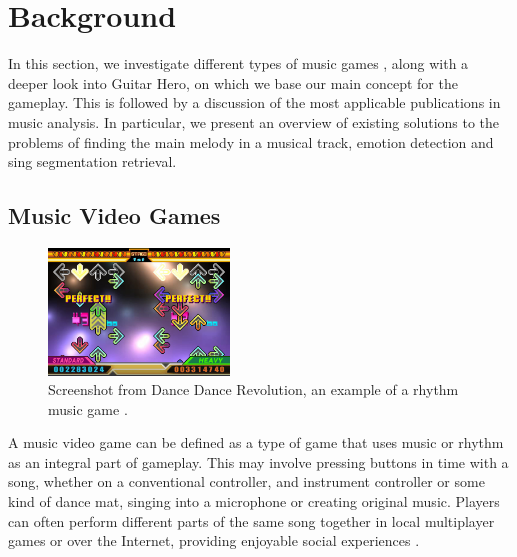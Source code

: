 
\chapter{Background} %

\label{Chapter4} %



In this section, we investigate different types of music games \cite{gametypes}, along with a deeper look into Guitar Hero, on which we base our main concept for the gameplay. This is followed by a discussion of the most applicable publications in music analysis. In particular, we present an overview of existing solutions to the problems of finding the main melody in a musical track, emotion detection and sing segmentation retrieval.

\vspace{20pt}


\section{Music Video Games }

\begin{figure}
  \vspace{-40pt}

  \begin{center}
    \includegraphics[width=0.43\textwidth]{Figures/dancedancerevolution}
  \end{center}
  \caption{Screenshot from Dance Dance Revolution, an example of a rhythm music game \cite{DDR}.}
  \label{fig:DDR}
\end{figure}

A music video game can be defined as a type of game that uses music or rhythm as an integral part of gameplay. This may involve pressing buttons in time with a song, whether on a conventional controller, and instrument controller or some kind of dance mat, singing into a microphone or creating original music. Players can often perform different parts of the same song together in local multiplayer games or over the Internet, providing enjoyable social experiences \cite{mvgdef}.

